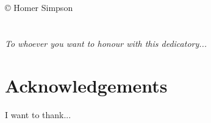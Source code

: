 \documentclass[12pt,french,english,twoside]{report} %
\newcommand\BackgroundPic{
    \put(0,0){
    \parbox[b][\paperheight]{\paperwidth}{%
    \vfill
    \centering
    \texttt{[image: fig/cover\_background.pdf]}
    \vfill
}}}
\begin{document}
\clearpage
\thispagestyle{empty}



\chapter*{}
{\par\vspace*{\fill}} {\centering © Homer Simpson \par }{\clearpage}

\chapter*{}
\begin{flushright}
	\textit{To whoever you want to honour with this dedicatory...}
\end{flushright}

\chapter*{}

\clearpage
{}




\chapter*{Acknowledgements}
I want to thank...

\chapter*{}

\dominitoc
\tableofcontents %
\listoffigures
\clearpage
\printglossary[type=\acronymtype]

\adjustmtc

\cleardoublepage %
\end{document}
